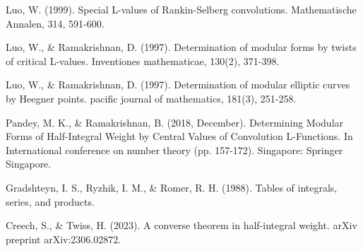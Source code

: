\documentclass[12pt,reqno,oneside]{amsart}
\begin{document}
\begin{thebibliography}{99}
    Luo, W. (1999). Special L-values of Rankin-Selberg convolutions. Mathematische Annalen, 314, 591-600.

    Luo, W., \& Ramakrishnan, D. (1997). Determination of modular forms by twists of critical L-values. Inventiones mathematicae, 130(2), 371-398.

    Luo, W., \& Ramakrishnan, D. (1997). Determination of modular elliptic curves by Heegner points. pacific journal of mathematics, 181(3), 251-258.

    Pandey, M. K., \& Ramakrishnan, B. (2018, December). Determining Modular Forms of Half-Integral Weight by Central Values of Convolution L-Functions. In International conference on number theory (pp. 157-172). Singapore: Springer Singapore.

    Gradshteyn, I. S., Ryzhik, I. M., \& Romer, R. H. (1988). Tables of integrals, series, and products.

    Creech, S., \& Twiss, H. (2023). A converse theorem in half-integral weight. arXiv preprint arXiv:2306.02872.

\end{thebibliography}
\end{document}
